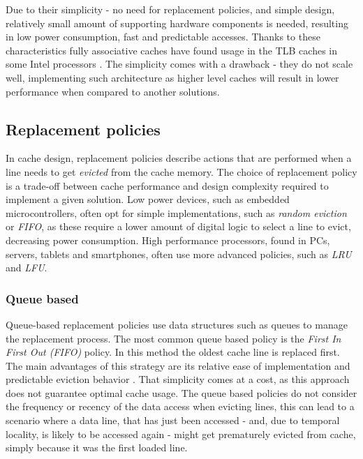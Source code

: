 \noindent Due to their simplicity - no need for replacement policies, and simple design, relatively small amount of supporting hardware components is needed, resulting in low power %
consumption, fast and predictable accesses. Thanks to these characteristics fully associative caches have found usage in the TLB caches in some Intel processors \cite{whatevery}. The simplicity
comes with a drawback - they do not scale well, implementing such architecture as higher level caches will result in lower performance when compared to another solutions. %


%
\subsection{Replacement policies} \label{sec:eviction_policies}
In cache design, replacement policies describe actions that are performed when a line needs to get \textit{evicted} from the cache memory.
The choice of replacement policy is a trade-off between cache performance and design complexity required to implement a given solution. Low power
devices, such as embedded microcontrollers, often opt for simple implementations, such as \textit{random eviction} or \textit{FIFO}, as these require
a lower amount of digital logic to select a line to evict, decreasing power consumption. High performance processors, found in PCs, servers, tablets and smartphones,
often use more advanced policies, such as \textit{LRU} and \textit{LFU}.

\subsubsection{Queue based}
Queue-based replacement policies use data structures such as queues to manage the replacement process. The most common queue based policy is the
\textit{First In First Out (FIFO)} policy. In this method the oldest cache line is replaced first. The main advantages of this strategy are
its relative ease of implementation and predictable eviction behavior \cite{fifo1}. That simplicity comes at a cost, as this approach does not guarantee optimal cache usage. The queue
based policies do not consider the frequency or recency of the data access when evicting lines, this can lead to a scenario where a data line, that has just been accessed - and, due to
temporal locality, is likely to be accessed again - might get prematurely evicted from cache, simply because it was the first loaded line.

